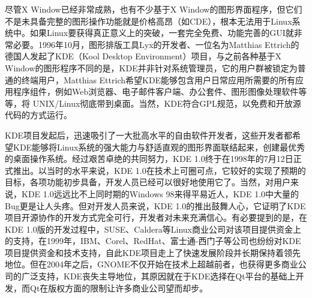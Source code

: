 \documentclass[cm-default,no-math,SlantFont,CJKnumber,a4papper,oneside]{ctexbook}
\begin{document}
尽管X Window已经非常成熟，也有不少基于X Window的图形界面程序，但它们不是未具备完整的图形操作功能就是价格高昂（如CDE），根本无法用于Linux系统中。如果Linux要获得真正意义上的突破，一套完全免费、功能完善的GUI就非常必要。1996年10月，图形排版工具Lyx的开发者、一位名为Matthias Ettrich的德国人发起了KDE（Kool Desktop Environment）项目，与之前各种基于X Window的图形程序不同的是，KDE并非针对系统管理员，它的用户群被锁定为普通的终端用户，Matthias Ettrich希望KDE能够包含用户日常应用所需要的所有应用程序组件，例如Web浏览器、电子邮件客户端、办公套件、图形图像处理软件等等，将 UNIX/Linux彻底带到桌面。当然，KDE符合GPL规范，以免费和开放源代码的方式运行。


     KDE项目发起后，迅速吸引了一大批高水平的自由软件开发者，这些开发者都希望KDE能够将Linux系统的强大能力与舒适直观的图形界面联结起来，创建最优秀的桌面操作系统。经过艰苦卓绝的共同努力，KDE 1.0终于在1998年的7月12日正式推出。以当时的水平来说，KDE 1.0在技术上可圈可点，它较好的实现了预期的目标，各项功能初步具备，开发人员已经可以很好地使用它了。当然，对用户来说，KDE 1.0远远比不上同时期的Windows 98来得平易近人，KDE 1.0中大量的Bug更是让人头疼。但对开发人员来说，KDE 1.0的推出鼓舞人心，它证明了KDE项目开源协作的开发方式完全可行，开发者对未来充满信心。有必要提到的是，在KDE 1.0版的开发过程中，SUSE、Caldera等Linux商业公司对该项目提供资金上的支持，在1999年，IBM、Corel、RedHat、富士通-西门子等公司也纷纷对KDE项目提供资金和技术支持，自此KDE项目走上了快速发展阶段并长期保持着领先地位。但在2004年之后，GNOME不仅开始在技术上超越前者，也获得更多商业公司的广泛支持，KDE丧失主导地位，其原因就在于KDE选择在Qt平台的基础上开发，而Qt在版权方面的限制让许多商业公司望而却步。
\end{document}
